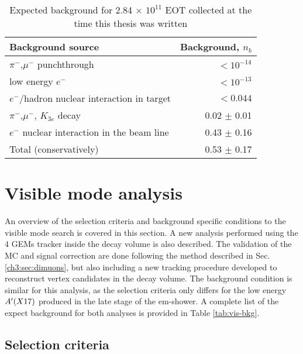 \begin{table}[bth!]
  \centering
  \caption[Invisible mode background]{Expected background for 2.84 $\times$ $10^{11}$ EOT collected at the time this thesis was written \cite{NA64:2019imj}}
  \begin{tabular}{lr}
    \hline \hline
    Background source & Background, $n_b$ \\
    \hline
    $\pi^-$,$\mu^-$ punchthrough                      & $<10^{-14}$ \\
    low energy $e^-$                                  & $<10^{-13}$ \\
    $e^-$/hadron nuclear interaction in target        & $<0.044$   \\
    $\pi^-$,$\mu^-$, $K_{3e}$ decay                    & 0.02 $\pm$ 0.01 \\
    $e^-$ nuclear interaction in the  beam line       & 0.43 $\pm$ 0.16 \\
    \hline
    Total (conservatively)                            & 0.53 $\pm$ 0.17 \\
    \hline \hline                       
  \end{tabular}
  \label{tab:inv-bkg}
\end{table}


\FloatBarrier\noindent
\section{Visible mode analysis}
\label{ch3:sec:analysis-vis}

An overview of the selection criteria and background specific conditions to the visible mode search is covered in this section. A new analysis performed using the 4 GEMs tracker inside the decay volume is also described. The validation of the MC and signal correction are done following the method described in Sec.\ref{ch3:sec:dimuons}, but also including a new tracking procedure developed to reconstruct vertex candidates in the decay volume. The background condition is similar for this analysis, as the selection criteria only differs for the low energy $A'(X17)$ produced in the late stage of the em-shower. A complete list of the expect background for both analyses is provided in Table \ref{tab:vis-bkg}.

\subsection{Selection criteria}
\label{ch3:sec:selection-criteria-vis}

